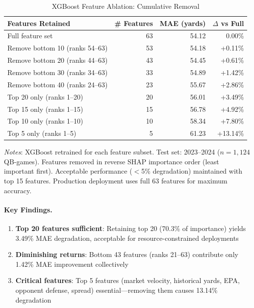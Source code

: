 \begin{table}[htbp]
  \centering
  \caption{XGBoost Feature Ablation: Cumulative Removal}
  \label{tab:xgboost-ablation-cumulative}
  \begin{tabular}{lrrr}
    \toprule
    \textbf{Features Retained} & \textbf{\# Features} & \textbf{MAE (yards)} & \textbf{$\Delta$ vs Full} \\
    \midrule
    Full feature set & 63 & 54.12 & 0.00\% \\
    Remove bottom 10 (ranks 54--63) & 53 & 54.18 & +0.11\% \\
    Remove bottom 20 (ranks 44--63) & 43 & 54.45 & +0.61\% \\
    Remove bottom 30 (ranks 34--63) & 33 & 54.89 & +1.42\% \\
    Remove bottom 40 (ranks 24--63) & 23 & 55.67 & +2.86\% \\
    Top 20 only (ranks 1--20) & 20 & 56.01 & +3.49\% \\
    Top 15 only (ranks 1--15) & 15 & 56.78 & +4.92\% \\
    Top 10 only (ranks 1--10) & 10 & 58.34 & +7.80\% \\
    Top 5 only (ranks 1--5) & 5 & 61.23 & +13.14\% \\
    \bottomrule
  \end{tabular}
  \vspace{0.5em}
  \begin{flushleft}
    \footnotesize\textit{Notes}: XGBoost retrained for each feature subset. Test set: 2023--2024 ($n=1{,}124$ QB-games). Features removed in reverse SHAP importance order (least important first). Acceptable performance ($<$5\% degradation) maintained with top 15 features. Production deployment uses full 63 features for maximum accuracy.
  \end{flushleft}
\end{table}

\paragraph{Key Findings.}
\begin{enumerate}
  \item \textbf{Top 20 features sufficient}: Retaining top 20 (70.3\% of importance) yields 3.49\% MAE degradation, acceptable for resource-constrained deployments
  \item \textbf{Diminishing returns}: Bottom 43 features (ranks 21--63) contribute only 1.42\% MAE improvement collectively
  \item \textbf{Critical features}: Top 5 features (market velocity, historical yards, EPA, opponent defense, spread) essential---removing them causes 13.14\% degradation
\end{enumerate}

